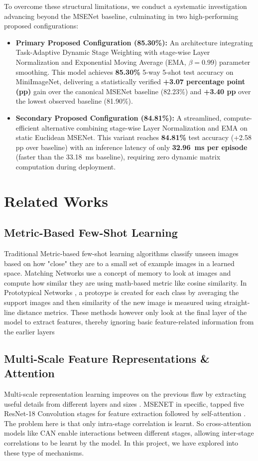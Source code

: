 \documentclass[conference]{IEEEtran}
\begin{document}
To overcome these structural limitations, we conduct a systematic investigation advancing beyond the MSENet baseline, culminating in two high-performing proposed configurations:
\begin{itemize}
    \item \textbf{Primary Proposed Configuration (85.30\%):} An architecture integrating Task-Adaptive Dynamic Stage Weighting with stage-wise Layer Normalization and Exponential Moving Average (EMA, $\beta = 0.99$) parameter smoothing. This model achieves \textbf{85.30\%} 5-way 5-shot test accuracy on MiniImageNet, delivering a statistically verified \textbf{+3.07 percentage point (pp)} gain over the canonical MSENet baseline (82.23\%) and \textbf{+3.40 pp} over the lowest observed baseline (81.90\%).
    \item \textbf{Secondary Proposed Configuration (84.81\%):} A streamlined, compute-efficient alternative combining stage-wise Layer Normalization and EMA on static Euclidean MSENet. This variant reaches \textbf{84.81\%} test accuracy (+2.58 pp over baseline) with an inference latency of only \textbf{32.96~ms per episode} (faster than the 33.18~ms baseline), requiring zero dynamic matrix computation during deployment.
\end{itemize}


\section{Related Works}
\subsection{Metric-Based Few-Shot Learning}
Traditional Metric-based few-shot learning algorithms classify unseen images based on how "close" they are to a small set of example images in a learned space. Matching Networks \cite{vinyals2016matching} use a concept of memory to look at images and compute how similar they are using math-based metric like cosine similarity. In Prototypical Networks \cite{snell2017prototypical}, a protoype is created for each class by averaging the support images and then similarity of the new image is measured using straight-line distance metrics. These methods however only look at the final layer of the model to extract features, thereby ignoring basic feature-related information from the earlier layers

\subsection{Multi-Scale Feature Representations \& Attention}
Multi-scale representation learning improves on the previous flaw by extracting useful details from different layers and sizes \cite{he2016deep}. MSENET \cite{askari2023enhancing} in specific, tapped five ResNet-18 Convolution stages for feature extraction followed by self-attention \cite{wang2018non, pytorch_attention}. The problem here is that only intra-stage correlation is learnt. So cross-attention models like CAN \cite{hou2019cross} enable interactions between different stages, 
allowing inter-stage correlations to be learnt by the model. In this project, we have explored into these type of mechanisms.
\end{document}
